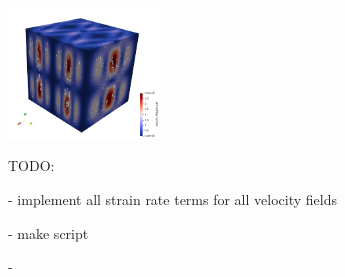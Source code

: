 \begin{itemize}
\includegraphics[width=4cm]{python_codes/fieldstone_31/velfield4}

\end{itemize}




TODO:

- implement all strain rate terms for all velocity fields

- make script  

- 


